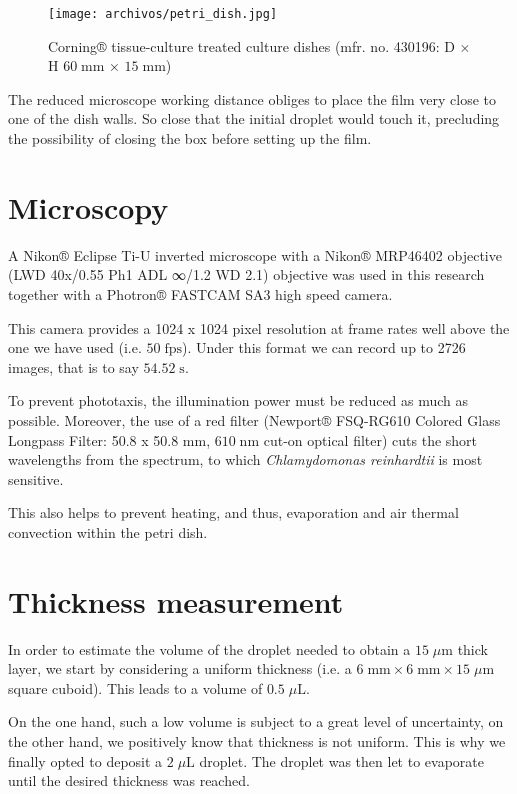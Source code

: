 \begin{figure}[H]
	\centering
	\texttt{[image: archivos/petri\_dish.jpg]}
	\caption{Corning® tissue-culture treated culture dishes (mfr. no. 430196: D × H $60 \; \textrm{mm}$ × $15 \; \textrm{mm}$)}
	\label{petri_dish}
\end{figure}

The reduced microscope working distance obliges to place the film very close to one of the dish walls. So close that the initial droplet would touch it, precluding the possibility of closing the box before setting up the film.

\section{Microscopy}

A Nikon® Eclipse Ti-U inverted microscope with a Nikon® MRP46402 objective (LWD 40x/0.55 Ph1 ADL ∞/1.2 WD 2.1) objective was used in this research together with a Photron® FASTCAM SA3 high speed camera.

This camera provides a 1024 x 1024 pixel resolution at frame rates well above the one we have used (i.e. $50  \; \textrm{fps}$). Under this format we can record up to 2726 images, that is to say $54.52 \; \textrm{s}$.

To prevent phototaxis, the illumination power must be reduced as much as possible. Moreover, the use of a red filter (Newport® FSQ-RG610 Colored Glass Longpass Filter: 50.8 x 50.8 $\textrm{mm}$, $610 \; \textrm{nm}$ cut-on optical filter) cuts the short wavelengths from the spectrum, to which \textit{Chlamydomonas reinhardtii} is most sensitive.

This also helps to prevent heating, and thus, evaporation and air thermal convection within the petri dish.

\section{Thickness measurement}

In order to estimate the volume of the droplet needed to obtain a $15  \; \mu \textrm{m}$ thick layer, we start by considering a uniform thickness (i.e. a $6 \; \textrm{mm} \times 6  \; \textrm{mm} \times 15 \; \mu \textrm{m}$ square cuboid). This leads to a volume of $0.5 \; \mu \textrm{L}$.

On the one hand, such a low volume is subject to a great level of uncertainty, on the other hand, we positively know that thickness is not uniform. This is why we finally opted to deposit a $ 2 \; \mu \textrm{L} $ droplet. The droplet was then let to evaporate until the desired thickness was reached. 

